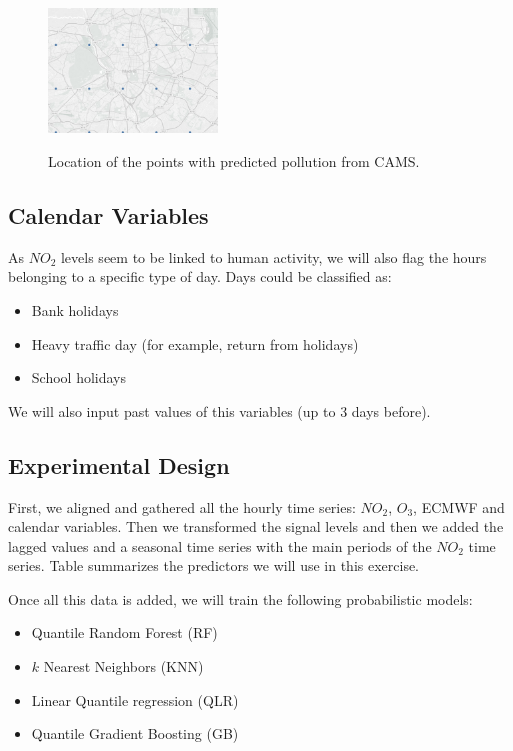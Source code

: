 \documentclass[a4paper,twocolumn,5p]{elsarticle}
\begin{document}
\begin{figure}
  \centering
  \includegraphics[width=0.4\textwidth]{camspoints}
  \label{figure:camspoints}
  \caption{Location of the points with predicted pollution from CAMS.}
\end{figure}

\subsection{Calendar Variables}
\label{sec:cal_data}

As $NO_2$ levels seem to be linked to human activity, we will also flag the hours 
belonging to a specific type of day. Days could be classified as:
\begin{itemize}
  \item Bank holidays
  \item Heavy traffic day (for example, return from holidays)
  \item School holidays
\end{itemize} 

We will also input past values of this variables (up to 3 days before).

\subsection{Experimental Design}
\label{sec:experimental-design}

First, we aligned and gathered all the hourly time series: $NO_2$, $O_3$, ECMWF and calendar variables.
Then we transformed the signal levels and then we added the lagged values 
and a seasonal time series with the 
main periods of the $NO_2$ time series. 
Table summarizes the predictors we will use in this exercise.

Once all this data is added, we will train the following probabilistic 
models:
\begin{itemize}
  \item Quantile Random Forest (RF)
  \item $k$ Nearest Neighbors (KNN)
  \item Linear Quantile regression (QLR)
  \item Quantile Gradient Boosting (GB)
\end{itemize}
\end{document}
